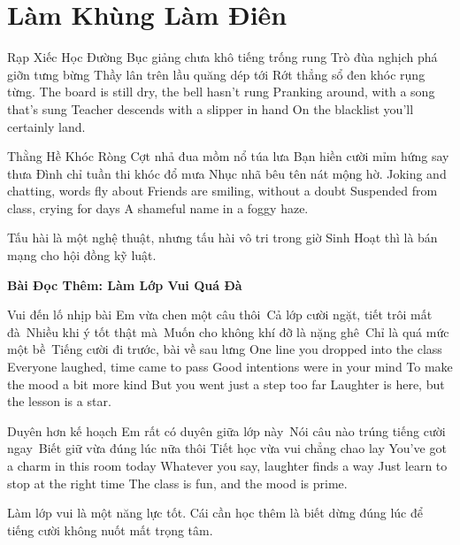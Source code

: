 \chapter{Làm Khùng Làm Điên}

\begin{tutuyetbox}{Rạp Xiếc Học Đường}
Bục giảng chưa khô tiếng trống rung
Trò đùa nghịch phá giỡn tưng bừng
Thầy lân trên lầu quăng dép tới
Rớt thẳng sổ đen khóc rụng từng.
\tcblower
The board is still dry, the bell hasn't rung 
Pranking around, with a song that's sung 
Teacher descends with a slipper in hand 
On the blacklist you'll certainly land.
\end{tutuyetbox}

\begin{tutuyetbox}{Thằng Hề Khóc Ròng}
Cợt nhả đua mồm nổ túa lưa
Bạn hiền cười mỉm hứng say thưa
Đình chỉ tuần thi khóc đổ mưa
Nhục nhã bêu tên nát mộng hờ.
\tcblower
Joking and chatting, words fly about 
Friends are smiling, without a doubt 
Suspended from class, crying for days 
A shameful name in a foggy haze.
\end{tutuyetbox}

\begin{ghichu}
Tấu hài là một nghệ thuật, nhưng tấu hài vô tri trong giờ Sinh Hoạt thì là bán mạng cho hội đồng kỹ luật.
\end{ghichu}

\ngancach
\begin{center}
{\normalsize\bfseries\color{titlecolor} Bài Đọc Thêm: Làm Lớp Vui Quá Đà}
\end{center}

\begin{lucbatbox}{Vui đến lố nhịp bài}
Em vừa chen một câu thôi\
Cả lớp cười ngặt, tiết trôi mất đà\
Nhiều khi ý tốt thật mà\
Muốn cho không khí đỡ là nặng ghê\
Chỉ là quá mức một bề\
Tiếng cười đi trước, bài về sau lưng
\tcblower
One line you dropped into the class 
Everyone laughed, time came to pass 
Good intentions were in your mind 
To make the mood a bit more kind 
But you went just a step too far 
Laughter is here, but the lesson is a star.
\end{lucbatbox}

\begin{tutuyetbox}{Duyên hơn kế hoạch}
Em rất có duyên giữa lớp này\
Nói câu nào trúng tiếng cười ngay\
Biết giữ vừa đúng lúc nữa thôi
Tiết học vừa vui chẳng chao lay
\tcblower
You've got a charm in this room today 
Whatever you say, laughter finds a way 
Just learn to stop at the right time 
The class is fun, and the mood is prime.
\end{tutuyetbox}

\begin{ghichu}
Làm lớp vui là một năng lực tốt. Cái cần học thêm là biết dừng đúng lúc để tiếng cười không nuốt mất trọng tâm.
\end{ghichu}
